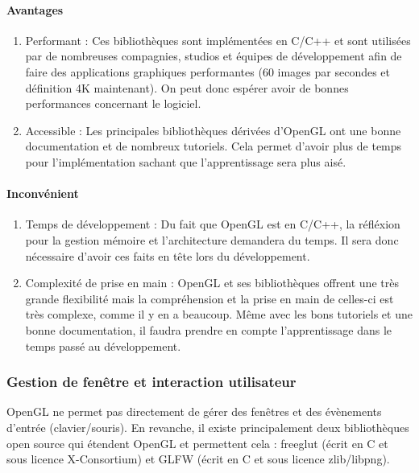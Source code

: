 \documentclass[a4paper]{article}
\begin{document}
\paragraph{Avantages}
    \begin{enumerate}
                \item {Performant :}
                Ces bibliothèques sont implémentées en C/C++ et sont utilisées par de nombreuses compagnies, studios et équipes de développement afin de faire des applications graphiques performantes (60 images par secondes et définition 4K maintenant). On peut donc espérer avoir de bonnes performances concernant le logiciel.
                
                \item {Accessible :}
                Les principales bibliothèques dérivées d'OpenGL ont une bonne documentation et de nombreux tutoriels. Cela permet d'avoir plus de temps pour l'implémentation sachant que l'apprentissage sera plus aisé.
                
    \end{enumerate}

\paragraph{Inconvénient}
    \begin{enumerate}
                \item {Temps de développement :}
                Du fait que OpenGL est en C/C++, la réfléxion pour la gestion mémoire et l'architecture demandera du temps. Il sera donc nécessaire d'avoir ces faits en tête lors du développement.
                
                \item {Complexité de prise en main :} 
                OpenGL et ses bibliothèques offrent une très grande flexibilité mais la compréhension et la prise en main de celles-ci est très complexe, comme il y en a beaucoup. Même avec les bons tutoriels et une bonne documentation, il faudra prendre en compte l'apprentissage dans le temps passé au développement.
                
    \end{enumerate}
    

\subsubsection{Gestion de fenêtre et interaction utilisateur}
    OpenGL ne permet pas directement de gérer des fenêtres et des évènements d'entrée (clavier/souris). En revanche, il existe principalement deux bibliothèques open source qui étendent OpenGL et permettent cela : freeglut\cite{freeglut} (écrit en C et sous licence X-Consortium) et GLFW\cite{GLFW} (écrit en C et sous licence zlib/libpng).\\
    
\end{document}
